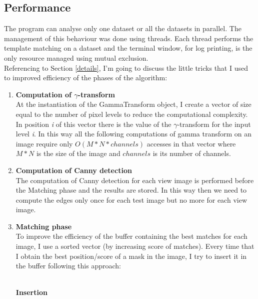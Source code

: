 \documentclass{article}
\begin{document}
\subsection{Performance}
The program can analyse only one dataset or all the datasets in parallel. The management of this behaviour was done using threads. Each thread performs the template matching on a dataset and the terminal window, for log printing, is the only resource managed using mutual exclusion.\\
Referencing to Section \ref{details}, I'm going to discuss the little tricks that I used to improved efficiency of the phases of the algorithm:
\begin{enumerate}
\item{\textbf{Computation of $\gamma$-transform}\\
At the instantiation of the GammaTransform object, I create a vector of size equal to the number of pixel levels to reduce the computational complexity. In position \textit{i} of this vector there is the value of the $\gamma$-transform for the input level \textit{i}. In this way all the following computations of gamma transform on an image require only $O(M*N*channels)$ accesses in that vector where $M*N$ is the size of the image and $channels$ is its number of channels.}
\item{\textbf{Computation of Canny detection}\\
The computation of Canny detection for each view image is performed before the Matching phase and the results are stored. In this way then we need to compute the edges only once for each test image but no more for each view image.
}
\item{\textbf{Matching phase}\\
To improve the efficiency of the buffer containing the best matches for each image, I use a sorted vector (by increasing score of matches). Every time that I obtain the best position/score of a mask in the image, I try to insert it in the buffer following this approach:\\\\
\begin{minipage}{.999\linewidth}
\begin{algorithm}[H]
\DontPrintSemicolon
\BlankLine
  \BlankLine
  \caption{\textbf{Insertion}}
\end{algorithm}

\end{minipage}}
\end{enumerate}
\end{document}
